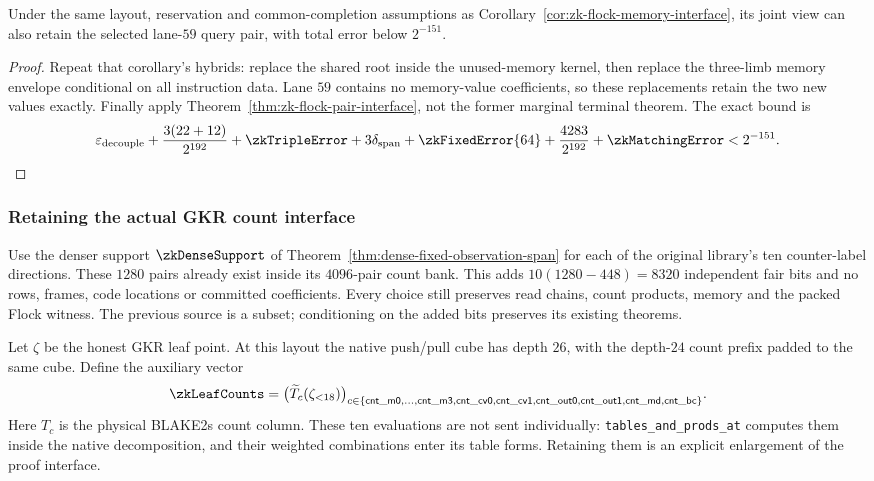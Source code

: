 \begin{corollary}\label{cor:zk-flock-pair-memory}
Under the same layout, reservation and common-completion assumptions as Corollary~\ref{cor:zk-flock-memory-interface}, its joint view can also retain the selected lane-$59$ query pair, with total error below $2^{-151}$.
\end{corollary}
\begin{proof}
Repeat that corollary's hybrids: replace the shared root inside the unused-memory kernel, then replace the three-limb memory envelope conditional on all instruction data. Lane $59$ contains no memory-value coefficients, so these replacements retain the two new values exactly. Finally apply Theorem~\ref{thm:zk-flock-pair-interface}, not the former marginal terminal theorem. The exact bound is
\[
 \varepsilon_{\mathrm{decouple}}+\frac{3(22+12)}{2^{192}}
 +\zkTripleError+3\delta_{\mathrm{span}}+\zkFixedError{64}
 +\frac{4283}{2^{192}}+\zkMatchingError<2^{-151}.
\]
\end{proof}

\subsubsection{Retaining the actual GKR count interface}

Use the denser support $\zkDenseSupport$ of Theorem~\ref{thm:dense-fixed-observation-span} for each of the original library's ten counter-label directions. These $1280$ pairs already exist inside its $4096$-pair count bank. This adds $10(1280-448)=8320$ independent fair bits and no rows, frames, code locations or committed coefficients. Every choice still preserves read chains, count products, memory and the packed Flock witness. The previous source is a subset; conditioning on the added bits preserves its existing theorems.

Let $\zeta$ be the honest GKR leaf point. At this layout the native push/pull cube has depth $26$, with the depth-$24$ count prefix padded to the same cube. Define the auxiliary vector
\[
 \zkLeafCounts=
 \bigl(\mle T_c(\zeta_{<18})\bigr)_{
 c\in\{\mathsf{cnt\_m0},\ldots,\mathsf{cnt\_m3},
 \mathsf{cnt\_cv0},\mathsf{cnt\_cv1},
 \mathsf{cnt\_out0},\mathsf{cnt\_out1},\mathsf{cnt\_md},\mathsf{cnt\_bc}\}}.
\]
Here $T_c$ is the physical BLAKE2s count column. These ten evaluations are not sent individually: \texttt{tables\_and\_prods\_at} computes them inside the native decomposition, and their weighted combinations enter its table forms. Retaining them is an explicit enlargement of the proof interface.

